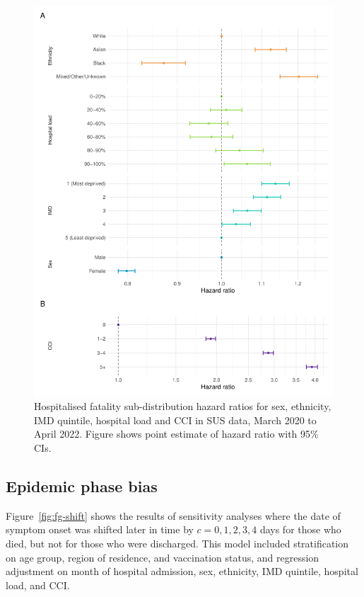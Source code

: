 \begin{figure}[htbp!]
    \centering
    \includegraphics[width=\textwidth]{fg_hazards.pdf}
    \caption[Hospitalised fatality sub-distribution hazard ratios for sex, ethnicity, IMD quintile, hospital load and CCI in SUS data, March 2020 to April 2022]{Hospitalised fatality sub-distribution hazard ratios for sex, ethnicity, IMD quintile, hospital load and CCI in SUS data, March 2020 to April 2022. Figure shows point estimate of hazard ratio with 95\% CIs.}\label{fig:fg-hazards}
\end{figure}

\cleardoublepage

\subsection{Epidemic phase bias}\label{appendix:epi-phase-bias}

Figure~\ref{fig:fg-shift} shows the results of sensitivity analyses where the date of symptom onset was shifted later in time by $c = 0,1,2,3,4$ days for those who died, but not for those who were discharged. This model included stratification on age group, region of residence, and vaccination status, and regression adjustment on month of hospital admission, sex, ethnicity, IMD quintile, hospital load, and CCI\@.

